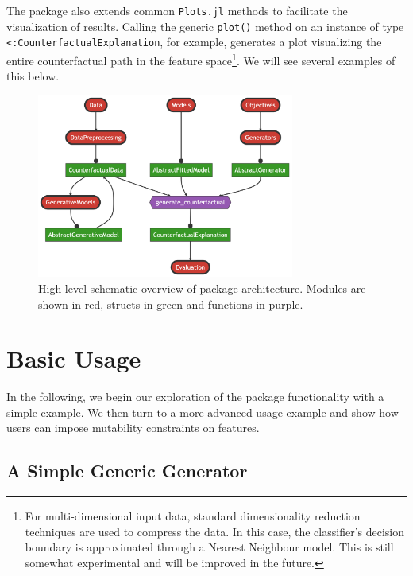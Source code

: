 \documentclass[
  letterpaper,
  DIV=11,
  numbers=noendperiod]{scrartcl}
\begin{document}
The package also extends common \texttt{Plots.jl} methods to facilitate
the visualization of results. Calling the generic \texttt{plot()} method
on an instance of type \texttt{\textless{}:CounterfactualExplanation},
for example, generates a plot visualizing the entire counterfactual path
in the feature space\footnote{For multi-dimensional input data, standard
  dimensionality reduction techniques are used to compress the data. In
  this case, the classifier's decision boundary is approximated through
  a Nearest Neighbour model. This is still somewhat experimental and
  will be improved in the future.}. We will see several examples of this
below.

\begin{figure}

{\centering \includegraphics[width=3.33333in,height=2.38095in]{www/pkg_architecture.png}

}

\caption{\label{fig-arch}High-level schematic overview of package
architecture. Modules are shown in red, structs in green and functions
in purple.}

\end{figure}

\hypertarget{sec-use}{%
\section{Basic Usage}\label{sec-use}}

In the following, we begin our exploration of the package functionality
with a simple example. We then turn to a more advanced usage example and
show how users can impose mutability constraints on features.

\hypertarget{a-simple-generic-generator}{%
\subsection{A Simple Generic
Generator}\label{a-simple-generic-generator}}
\end{document}

